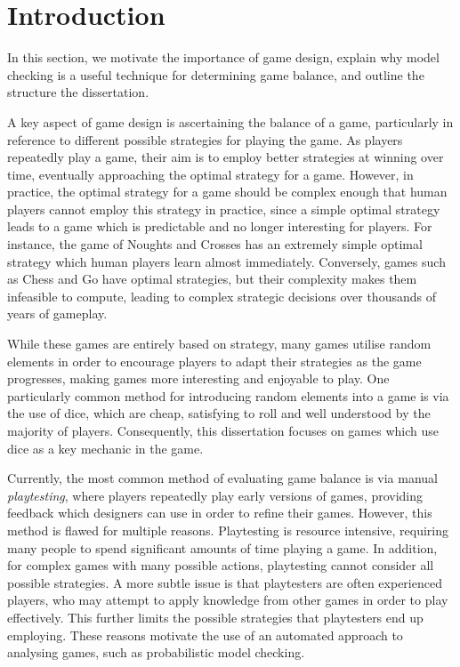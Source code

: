 \chapter{Introduction}
\label{introduction}


In this section, we motivate the importance of game design, explain why model checking is a useful technique for determining game balance, and outline the structure the dissertation.

A key aspect of game design is ascertaining the balance of a game, particularly in reference to different possible strategies for playing the game. As players repeatedly play a game, their aim is to employ better strategies at winning over time, eventually approaching the optimal strategy for a game. However, in practice, the optimal strategy for a game should be complex enough that human players cannot employ this strategy in practice, since a simple optimal strategy leads to a game which is predictable and no longer interesting for players. For instance, the game of Noughts and Crosses has an extremely simple optimal strategy which human players learn almost immediately. Conversely, games such as Chess and Go have optimal strategies, but their complexity makes them infeasible to compute, leading to complex strategic decisions over thousands of years of gameplay.

While these games are entirely based on strategy, many games utilise random elements in order to encourage players to adapt their strategies as the game progresses, making games more interesting and enjoyable to play. One particularly common method for introducing random elements into a game is via the use of dice, which are cheap, satisfying to roll and well understood by the majority of players. Consequently, this dissertation focuses on games which use dice as a key mechanic in the game.

Currently, the most common method of evaluating game balance is via manual \emph{playtesting}, where players repeatedly play early versions of games, providing feedback which designers can use in order to refine their games. However, this method is flawed for multiple reasons. Playtesting is resource intensive, requiring many people to spend significant amounts of time playing a game. In addition, for complex games with many possible actions, playtesting cannot consider all possible strategies. A more subtle issue is that playtesters are often experienced players, who may attempt to apply knowledge from other games in order to play effectively. This further limits the possible strategies that playtesters end up employing. These reasons motivate the use of an automated approach to analysing games, such as probabilistic model checking.

